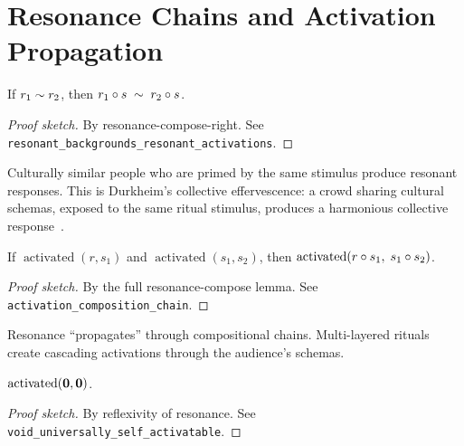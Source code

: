 \section{Resonance Chains and Activation Propagation}
\label{sec:ch4:chains}

\begin{theorem}
\label{thm:resonant-activations}
If $r_1 \sim r_2$, then
$r_1 \circ s \;\sim\; r_2 \circ s$.
\end{theorem}

\begin{proof}[Proof sketch]
By resonance-compose-right.
See \texttt{resonant\_backgrounds\_resonant\_activations}.
\end{proof}

\begin{remark}
Culturally similar people who are primed by the same stimulus produce
resonant responses.  This is Durkheim's collective effervescence: a
crowd sharing cultural schemas, exposed to the same ritual stimulus,
produces a harmonious collective response~\cite{durkheim1912}.
\end{remark}

\begin{theorem}
\label{thm:activation-composition}
If $\operatorname{activated}(r, s_1)$ and
$\operatorname{activated}(s_1, s_2)$, then
$\operatorname{activated}(r \circ s_1,\; s_1 \circ s_2)$.
\end{theorem}

\begin{proof}[Proof sketch]
By the full resonance-compose lemma.
See \texttt{activation\_composition\_chain}.
\end{proof}

\begin{remark}
Resonance ``propagates'' through compositional chains.  Multi-layered
rituals create cascading activations through the audience's schemas.
\end{remark}

\begin{theorem}
\label{thm:void-self-activatable}
$\operatorname{activated}(\mathbf{0}, \mathbf{0})$.
\end{theorem}

\begin{proof}[Proof sketch]
By reflexivity of resonance.
See \texttt{void\_universally\_self\_activatable}.
\end{proof}

